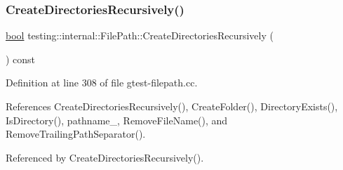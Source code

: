 \subsubsection{\texorpdfstring{Create\+Directories\+Recursively()}{CreateDirectoriesRecursively()}}
{\footnotesize\ttfamily \hyperlink{classbool}{bool} testing\+::internal\+::\+File\+Path\+::\+Create\+Directories\+Recursively (\begin{DoxyParamCaption}{ }\end{DoxyParamCaption}) const}



Definition at line 308 of file gtest-\/filepath.\+cc.



References Create\+Directories\+Recursively(), Create\+Folder(), Directory\+Exists(), Is\+Directory(), pathname\+\_\+, Remove\+File\+Name(), and Remove\+Trailing\+Path\+Separator().



Referenced by Create\+Directories\+Recursively().


